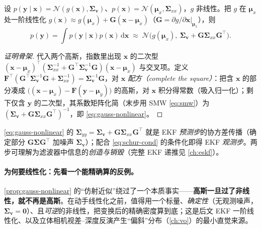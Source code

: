 \begin{proposition}\label{prop:gauss-nonlinear}
设 $p(\mathbf{y}\mid\mathbf{x})=\mathcal{N}(g(\mathbf{x}),\boldsymbol{\Sigma}_{\mathbf{v}})$、$p(\mathbf{x})=\mathcal{N}(\boldsymbol{\mu}_x,\boldsymbol{\Sigma}_{xx})$，$g$ 非线性。把 $g$ 在 $\boldsymbol{\mu}_x$ 处一阶线性化 $g(\mathbf{x})\approx g(\boldsymbol{\mu}_x)+\mathbf{G}(\mathbf{x}-\boldsymbol{\mu}_x)$（$\mathbf{G}=\partial g/\partial\mathbf{x}|_{\boldsymbol{\mu}_x}$），则
\begin{equation}
  p(\mathbf{y})=\int p(\mathbf{y}\mid\mathbf{x})p(\mathbf{x})\,\mathrm{d}\mathbf{x}
  \;\approx\;\mathcal{N}\big(g(\boldsymbol{\mu}_x),\ \boldsymbol{\Sigma}_{\mathbf{v}}+\mathbf{G}\boldsymbol{\Sigma}_{xx}\mathbf{G}^\top\big).
  \label{eq:gauss-nonlinear}
\end{equation}
\end{proposition}
\begin{proof}[证明骨架]
代入两个高斯，指数里出现 $\mathbf{x}$ 的二次型 $(\mathbf{x}-\boldsymbol{\mu}_x)^\top(\boldsymbol{\Sigma}_{xx}^{-1}+\mathbf{G}^\top\boldsymbol{\Sigma}_{\mathbf{v}}^{-1}\mathbf{G})(\mathbf{x}-\boldsymbol{\mu}_x)$ 与交叉项。定义 $\mathbf{F}^\top(\mathbf{G}^\top\boldsymbol{\Sigma}_{\mathbf{v}}^{-1}\mathbf{G}+\boldsymbol{\Sigma}_{xx}^{-1})=\boldsymbol{\Sigma}_{\mathbf{v}}^{-1}\mathbf{G}$，对 $\mathbf{x}$ \emph{配方（complete the square）}：把含 $\mathbf{x}$ 的部分凑成 $\big((\mathbf{x}-\boldsymbol{\mu}_x)-\mathbf{F}(\mathbf{y}-\boldsymbol{\mu}_y)\big)$ 的高斯，对 $\mathbf{x}$ 积分得常数（吸入归一化）；剩下仅含 $\mathbf{y}$ 的二次型，其系数矩阵化简（末步用 SMW \cref{eq:smw}）为 $(\boldsymbol{\Sigma}_{\mathbf{v}}+\mathbf{G}\boldsymbol{\Sigma}_{xx}\mathbf{G}^\top)^{-1}$，即 \cref{eq:gauss-nonlinear}。
\end{proof}
\noindent \cref{eq:gauss-nonlinear} 的 $\boldsymbol{\Sigma}_{yy}=\boldsymbol{\Sigma}_{\mathbf{v}}+\mathbf{G}\boldsymbol{\Sigma}_{xx}\mathbf{G}^\top$ 就是 EKF \emph{预测步}的协方差传播（确定部分 $\mathbf{G}\boldsymbol{\Sigma}\mathbf{G}^\top$ 加噪声 $\boldsymbol{\Sigma}_{\mathbf{v}}$）；配合 \cref{eq:schur-cond} 的条件化即得 EKF \emph{观测步}。两步可理解为滤波器中信息的\emph{创造与销毁}\cite{barfoot2024state}（完整 EKF 递推见 \cref{ch:eskf}）。

\paragraph{为何要线性化：先看一个能精确算的反例。}
\cref{prop:gauss-nonlinear} 的“仿射近似”绕过了一个本质事实——\textbf{高斯一旦过了非线性，就不再是高斯}。在动手线性化之前，值得用一个标量、\emph{确定性}（无观测噪声，$\boldsymbol{\Sigma}_{\mathbf{v}}=\mathbf{0}$）、且\emph{可逆}的非线性，把变换后的精确密度算到底；这是后文 EKF 一阶线性化、以及立体相机视差–深度反演产生“偏斜”分布（\cref{ch:vo}）的最小直觉来源。

